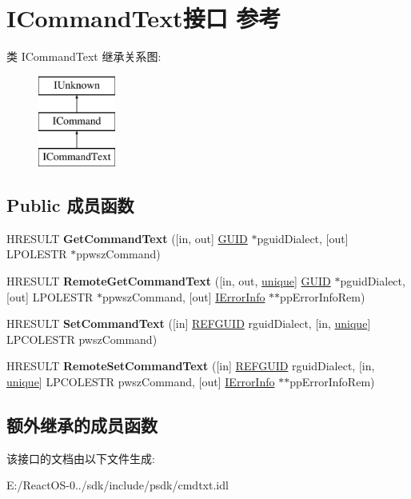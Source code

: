 \hypertarget{interface_i_command_text}{}\section{I\+Command\+Text接口 参考}
\label{interface_i_command_text}
类 I\+Command\+Text 继承关系图\+:\begin{figure}[H]
\begin{center}
\leavevmode
\includegraphics[height=3.000000cm]{interface_i_command_text}
\end{center}
\end{figure}
\subsection*{Public 成员函数}
\begin{DoxyCompactItemize}
\item 
\mbox{\label{interface_i_command_text_a1e894fc2411b6cd22101150cd7e5df57}} 
H\+R\+E\+S\+U\+LT {\bfseries Get\+Command\+Text} (\mbox{[}in, out\mbox{]} \hyperlink{interface_g_u_i_d}{G\+U\+ID} $\ast$pguid\+Dialect, \mbox{[}out\mbox{]} L\+P\+O\+L\+E\+S\+TR $\ast$ppwsz\+Command)
\item 
\mbox{\label{interface_i_command_text_afe6b72574f23d883eccf11b4d056d323}} 
H\+R\+E\+S\+U\+LT {\bfseries Remote\+Get\+Command\+Text} (\mbox{[}in, out, \hyperlink{interfaceunique}{unique}\mbox{]} \hyperlink{interface_g_u_i_d}{G\+U\+ID} $\ast$pguid\+Dialect, \mbox{[}out\mbox{]} L\+P\+O\+L\+E\+S\+TR $\ast$ppwsz\+Command, \mbox{[}out\mbox{]} \hyperlink{interface_i_error_info}{I\+Error\+Info} $\ast$$\ast$pp\+Error\+Info\+Rem)
\item 
\mbox{\label{interface_i_command_text_af84ca2e141554fca4114256b1584a78c}} 
H\+R\+E\+S\+U\+LT {\bfseries Set\+Command\+Text} (\mbox{[}in\mbox{]} \hyperlink{struct___g_u_i_d}{R\+E\+F\+G\+U\+ID} rguid\+Dialect, \mbox{[}in, \hyperlink{interfaceunique}{unique}\mbox{]} L\+P\+C\+O\+L\+E\+S\+TR pwsz\+Command)
\item 
\mbox{\label{interface_i_command_text_ab2928e8b568255b30a157dc03d17a0aa}} 
H\+R\+E\+S\+U\+LT {\bfseries Remote\+Set\+Command\+Text} (\mbox{[}in\mbox{]} \hyperlink{struct___g_u_i_d}{R\+E\+F\+G\+U\+ID} rguid\+Dialect, \mbox{[}in, \hyperlink{interfaceunique}{unique}\mbox{]} L\+P\+C\+O\+L\+E\+S\+TR pwsz\+Command, \mbox{[}out\mbox{]} \hyperlink{interface_i_error_info}{I\+Error\+Info} $\ast$$\ast$pp\+Error\+Info\+Rem)
\end{DoxyCompactItemize}
\subsection*{额外继承的成员函数}


该接口的文档由以下文件生成\+:\begin{DoxyCompactItemize}
\item 
E\+:/\+React\+O\+S-\/0../sdk/include/psdk/cmdtxt.\+idl\end{DoxyCompactItemize}
